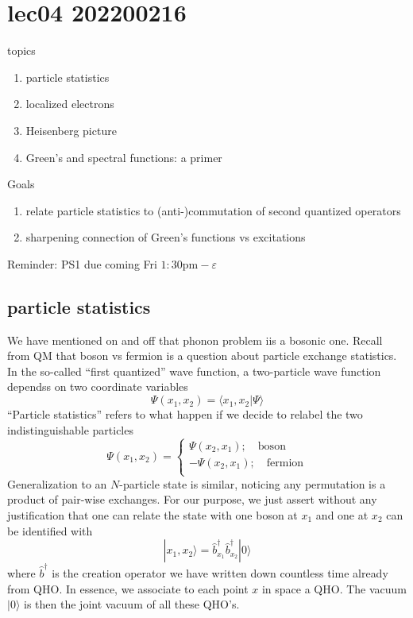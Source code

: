 \chapter{lec04 202200216}

topics

\begin{enumerate}
    \item particle statistics
    \item localized electrons
    \item Heisenberg picture
    \item Green's and spectral functions: a primer
\end{enumerate}

Goals

\begin{enumerate}
    \item relate particle statistics to (anti-)commutation of second quantized operators
    \item sharpening connection of Green's functions vs excitations
\end{enumerate}

Reminder: PS1 due coming Fri $1:30\text{pm}-\varepsilon$

\section{particle statistics}

We have mentioned on and off that phonon problem iis a bosonic one. Recall from QM that boson vs fermion is a question about particle exchange statistics. In the so-called ``first quantized'' wave function, a two-particle wave function dependss on two coordinate variables
\[ \Psi \left( x_1,x_2 \right) =\langle x_1,x_2|\Psi \rangle \]
``Particle statistics'' refers to what happen if we decide to relabel the two indistinguishable particles
\[ \Psi \left( x_1,x_2 \right) =\begin{cases}
	\Psi \left( x_2,x_1 \right) ;\quad \mathrm{boson}\\
	-\Psi \left( x_2,x_1 \right) ;\quad \mathrm{fermion}\\
\end{cases}\]
Generalization to an $N$-particle state is similar, noticing any permutation is a product of pair-wise exchanges. For our purpose, we just assert without any justification that one can relate the state with one boson at $x_1$ and one at $x_2$ can be identified with
\[ |x_1,x_2\rangle =\hat{b}_{x_1}^{\dagger}\hat{b}_{x_2}^{\dagger}|0\rangle \]
where $\hat{b}^\dagger$ is the creation operator we have written down countless time already from QHO. In essence, we associate to each point $x$ in space a QHO. The vacuum $|0\rangle$ is then the joint vacuum of all these QHO's.

